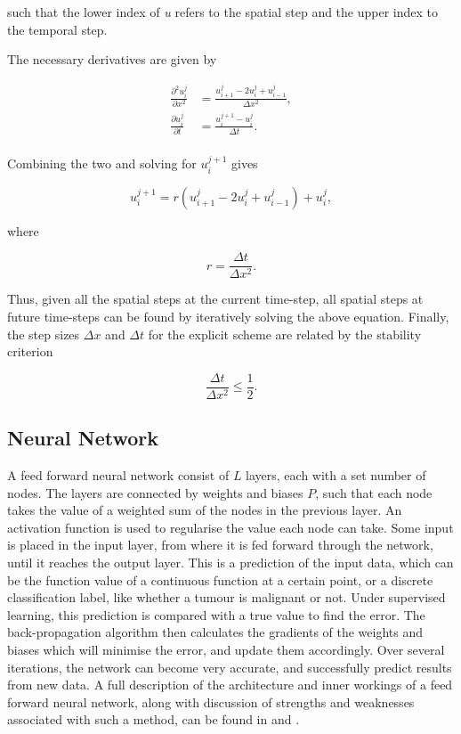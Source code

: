 \documentclass[multicolumn, 9pt]{extarticle}
\begin{document}
such that the lower index of \textit{u} refers to the spatial step and the upper index to the temporal step.

The necessary derivatives are given by

\begin{align*}
	\frac{\partial^2u_i^j}{\partial x^2} & = \frac{u_{i+1}^{j} - 2u_{i}^{j} + u_{i-1}^{j}}{\Delta x^{2}}, \\
	\frac{\partial u_i^j}{\partial t}    & = \frac{u_{i}^{j+1} - u_{i}^{j}}{\Delta t}.                    \\
\end{align*}

Combining the two and solving for $u_{i}^{j+1}$ gives

\begin{equation}\label{eq:euler}
	u_{i}^{j+1} = r(u_{i+1}^{j} - 2u_{i}^{j} + u_{i-1}^{j}) + u_{i}^{j},
\end{equation}

where

\begin{equation*}
	r = \frac{\Delta t}{\Delta x^{2}}.
\end{equation*}

Thus, given all the spatial steps at the current time-step, all spatial steps at future time-steps can be found by iteratively solving the above equation. Finally, the step sizes $\Delta x$ and $\Delta t$ for the explicit scheme are related by the stability criterion

\begin{equation}\label{eq:stability_crit}
	\frac{\Delta t}{\Delta x^{2}} \le \frac{1}{2}.
\end{equation}

\subsection{Neural Network}
A feed forward neural network consist of $L$ layers, each with a set number of nodes. The layers are connected by weights and biases $P$, such that each node takes the value of a weighted sum of the nodes in the previous layer. An activation function is used to regularise the value each node can take. Some input is placed in the input layer, from where it is fed forward through the network, until it reaches the output layer. This is a prediction of the input data, which can be the function value of a continuous function at a certain point, or a discrete classification label, like whether a tumour is malignant or not. Under supervised learning, this prediction is compared with a true value to find the error. The back-propagation algorithm then calculates the gradients of the weights and biases which will minimise the error, and update them accordingly. Over several iterations, the network can become very accurate, and successfully predict results from new data. A full description of the architecture and inner workings of a feed forward neural network, along with discussion of strengths and weaknesses associated with such a method, can be found in \cite{p2S} and \cite{p2HO}.
\end{document}
